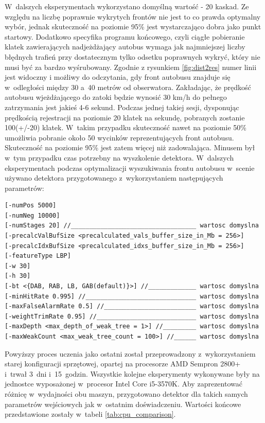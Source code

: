W~dalszych eksperymentach wykorzystano domyślną wartość - 20 kaskad. Ze względu
na liczbę poprawnie wykrytych frontów nie jest to co prawda optymalny wybór,
jednak skuteczność na poziomie 95\% jest wystarczająco dobra jako punkt startowy. Dodatkowo
specyfika programu końcowego, czyli ciągłe pobieranie klatek zawierających
nadjeżdżający autobus wymaga jak najmniejszej liczby błędnych trafień przy 
dostatecznym tylko odsetku poprawnych wykryć, który nie musi być za bardzo wyśrubowany.
Zgodnie z rysunkiem \ref{fig:dist2res}
numer linii jest widoczny i możliwy do odczytania, gdy front autobusu znajduje 
się w~odległości
między 30 a~40 metrów od obserwatora. Zakładając, że prędkość autobusu wjeżdżającego
do zatoki będzie wynosić 30 km/h do pełnego zatrzymania jest jakieś 4-6 sekund. 
Podczas jednej
takiej sesji, dysponując prędkością rejestracji na poziomie 20 klatek na sekundę, 
pobranych
zostanie 100(+/-20) klatek. W~takim przypadku skuteczność nawet na poziomie 50\% 
umożliwia pobranie około 50 wycinków reprezentujących front autobusu. 
Skuteczność na poziomie
95\% jest zatem więcej niż zadowalająca. Minusem był w~tym przypadku czas potrzebny
na wyszkolenie detektora. W~dalszych eksperymentach podczas optymalizacji wyszukiwania
frontu autobusu w~scenie używano detektora przygotowanego z~wykorzystaniem następujących 
parametrów:

\begin{lstlisting}[caption={Ostateczne parametry wywołania narzędzia opencv\_traincascade},label=lst:front_end_parameter_values]
[-numPos 5000]
[-numNeg 10000]
[-numStages 20] //__________________________________ wartosc domyslna
[-precalcValBufSize <precalculated_vals_buffer_size_in_Mb = 256>]
[-precalcIdxBufSize <precalculated_idxs_buffer_size_in_Mb = 256>]
[-featureType LBP]
[-w 30]
[-h 30]
[-bt <{DAB, RAB, LB, GAB(default)}>] //_____________ wartosc domyslna
[-minHitRate 0.995] //______________________________ wartosc domyslna
[-maxFalseAlarmRate 0.5] //_________________________ wartosc domyslna
[-weightTrimRate 0.95] //___________________________ wartosc domyslna
[-maxDepth <max_depth_of_weak_tree = 1>] //_________ wartosc domyslna
[-maxWeakCount <max_weak_tree_count = 100>] //______ wartosc domyslna
\end{lstlisting}

Powyższy proces uczenia jako ostatni został przeprowadzony z~wykorzystaniem
starej konfiguracji sprzętowej, opartej na procesorze AMD Sempron 2800+ i~trwał
3~dni i~15~godzin. Wszystkie kolejne eksperymenty wykonywane były na jednostce
wyposażonej w~procesor Intel Core i5-3570K. Aby zaprezentować różnicę
w~wydajności obu maszyn, przygotowano detektor dla takich samych parametrów
wejściowych jak w~ostatnim doświadczeniu. Wartości końcowe przedstawione zostały
w~tabeli \ref{tab:cpu_comparison}.


